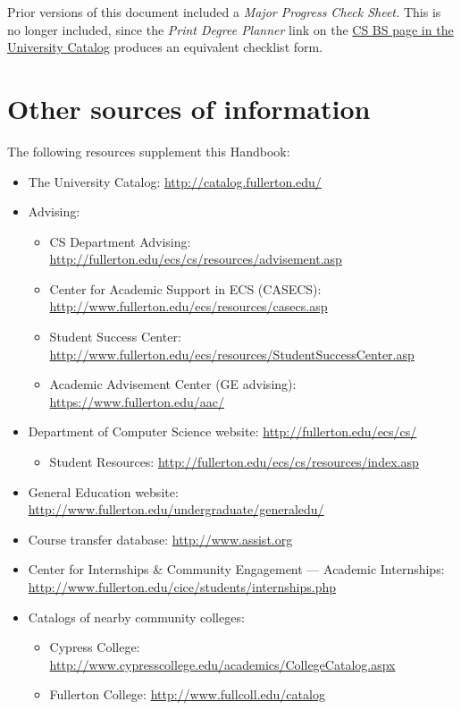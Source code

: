 \documentclass{book}
\begin{document}
Prior versions of this document included a \emph{Major Progress Check Sheet.} This is no longer included, since the \emph{Print Degree Planner} link on the \href{http://catalog.fullerton.edu/preview_program.php?catoid=2&poid=537&returnto=137}{CS BS page in the University Catalog} produces an equivalent checklist form.

\chapter{Other sources of information}

The following resources supplement this Handbook:
\begin{itemize}
\item The University Catalog: \url{http://catalog.fullerton.edu/}
\item Advising:
  \begin{itemize}
    \item CS Department Advising: \url{http://fullerton.edu/ecs/cs/resources/advisement.asp}
  \item Center for Academic Support in ECS (CASECS): \url{http://www.fullerton.edu/ecs/resources/casecs.asp}
  \item Student Success Center: \url{http://www.fullerton.edu/ecs/resources/StudentSuccessCenter.asp}
    \item Academic Advisement Center (GE advising): \url{https://www.fullerton.edu/aac/}
    \end{itemize}
\item Department of Computer Science website: \url{http://fullerton.edu/ecs/cs/}
  \begin{itemize}
  \item Student Resources: \url{http://fullerton.edu/ecs/cs/resources/index.asp}
  \end{itemize}
\item General Education website: \url{http://www.fullerton.edu/undergraduate/generaledu/}
\item Course transfer database: \url{http://www.assist.org}
\item Center for Internships \& Community Engagement --- Academic Internships: \url{http://www.fullerton.edu/cice/students/internships.php}
\item Catalogs of nearby community colleges:
  \begin{itemize}
    \item Cypress College: \url{http://www.cypresscollege.edu/academics/CollegeCatalog.aspx}
    \item Fullerton College: \url{http://www.fullcoll.edu/catalog}

\end{itemize}
\end{itemize}
\end{document}
